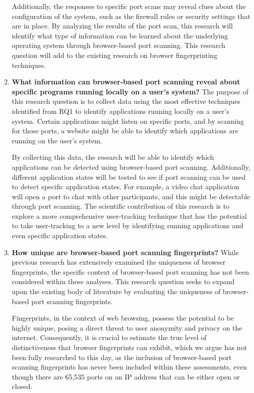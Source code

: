 \begin{enumerate}[RQ1.]
Additionally, the responses to specific port scans may reveal clues about the configuration of the system, such as the firewall rules or security settings that are in place. By analyzing the results of the port scan, this research will identify what type of information can be learned about the underlying operating system through browser-based port scanning. This research question will add to the existing research on browser fingerprinting techniques.

\item \textbf{What information can browser-based port scanning reveal about specific programs running locally on a user's system?} The purpose of this research question is to collect data using the most effective techniques identified from RQ1 to identify applications running locally on a user's system. Certain applications might listen on specific ports, and by scanning for those ports, a website might be able to identify which applications are running on the user's system.

By collecting this data, the research will be able to identify which applications can be detected using browser-based port scanning. Additionally, different application states will be tested to see if port scanning can be used to detect specific application states. For example, a video chat application will open a port to chat with other participants, and this might be detectable through port scanning. The scientific contribution of this research is to explore a more comprehensive user-tracking technique that has the potential to take user-tracking to a new level by identifying running applications and even specific application states.

\item \textbf{How unique are browser-based port scanning fingerprints?}
While previous research has extensively examined the uniqueness of browser fingerprints, the specific context of browser-based port scanning has not been considered within these analyses. This research question seeks to expand upon the existing body of literature by evaluating the uniqueness of browser-based port scanning fingerprints.

Fingerprints, in the context of web browsing, possess the potential to be highly unique, posing a direct threat to user anonymity and privacy on the internet. Consequently, it is crucial to estimate the true level of distinctiveness that browser fingerprints can exhibit, which we argue has not been fully researched to this day, as the inclusion of browser-based port scanning fingerprints has never been included within these assessments, even though there are 65,535 ports on an IP address that can be either open or closed.
\end{enumerate}

